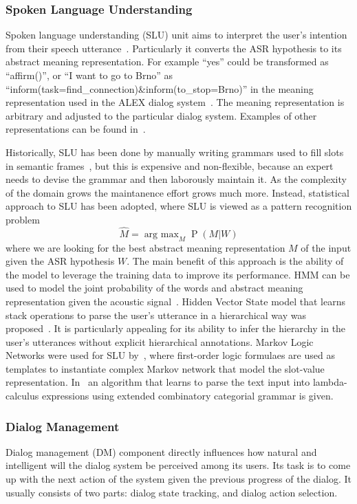 \documentclass[10pt,twocolumn]{article}
\begin{document}
\subsubsection{Spoken Language Understanding}
Spoken language understanding (SLU) unit aims to interpret the user's intention from their speech utterance~\cite{wang2005spoken}. Particularly it converts the ASR hypothesis to its abstract meaning representation. For example ``yes'' could be transformed as ``affirm()'', or ``I want to go to Brno'' as ``inform(task=find\_connection)\&inform(to\_stop=Brno)'' in the meaning representation used in the ALEX dialog system~\cite{duvsek2014alex}. The meaning representation is arbitrary and adjusted to the particular dialog system. Examples of other representations can be found in~\cite{skantze2008galatea,he2003data}.

Historically, SLU has been done by manually writing grammars used to fill slots in semantic frames~\cite{ward1994recent,dowding1993gemini}, but this is expensive and non-flexible, because an expert needs to devise the grammar and then laborously maintain it. As the complexity of the domain grows the maintanence effort grows much more. Instead, statistical approach to SLU has been adopted, where SLU is viewed as a pattern recognition problem
$$\hat M=\operatorname{arg~max}_M \operatorname{P}(M|W)$$
where we are looking for the best abstract meaning representation $M$ of the input given the ASR hypothesis $W$. The main benefit of this approach is the ability of the model to leverage the training data to improve its performance. HMM can be used to model the joint probability of the words and abstract meaning representation given the acoustic signal~\cite{pieraccini1992progress,pieraccini1992stochastic}. Hidden Vector State model that learns stack operations to parse the user's utterance in a hierarchical way was proposed~\cite{he2003data}. It is particularly appealing for its ability to infer the hierarchy in the user's utterances without explicit hierarchical annotations. Markov Logic Networks were used for SLU by~\cite{meza2008spoken}, where first-order logic formulaes are used as templates to instantiate complex Markov network that model the slot-value representation. In~\cite{zettlemoyer2007online} an algorithm that learns to parse the text input into lambda-calculus expressions using extended combinatory categorial grammar is given.

\subsubsection{Dialog Management}
Dialog management (DM) component directly influences how natural and intelligent will the dialog system be perceived among its users. Its task is to come up with the next action of the system given the previous progress of the dialog. It usually consists of two parts: dialog state tracking, and dialog action selection.
\end{document}
